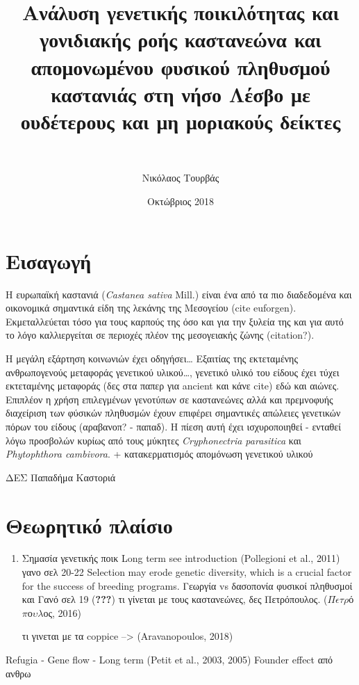 \documentclass[12pt,a4paper,]{report}
\title{Ανάλυση γενετικής ποικιλότητας και γονιδιακής ροής καστανεώνα και
απομονωμένου φυσικού πληθυσμού καστανιάς στη νήσο Λέσβο με ουδέτερους
και μη μοριακούς δείκτες}
\subtitle{~}
\author{Νικόλαος Τουρβάς}
\date{Οκτώβριος 2018}
\begin{document}
\maketitle

\section{Εισαγωγή}

Η ευρωπαϊκή καστανιά (\emph{Castanea sativa} Mill.) είναι ένα από τα πιο
διαδεδομένα και οικονομικά σημαντικά είδη της λεκάνης της Μεσογείου
(cite euforgen). Εκμεταλλεύεται τόσο για τους καρπούς της όσο και για
την ξυλεία της και για αυτό το λόγο καλλιεργείται σε περιοχές πλέον της
μεσογειακής ζώνης (citation?).

Η μεγάλη εξάρτηση κοινωνιών έχει οδηγήσει\ldots{} Εξαιτίας της
εκτεταμένης ανθρωπογενούς μεταφοράς γενετικού υλικού\ldots{}, γενετικό
υλικό του είδους έχει τύχει εκτεταμένης μεταφοράς (δες στα παπερ για
ancient και κάνε cite) εδώ και αιώνες. Επιπλέον η χρήση επιλεγμένων
γενοτύπων σε καστανεώνες αλλά και πρεμνοφυής διαχείριση των φύσικών
πληθυσμών έχουν επιφέρει σημαντικές απώλειες γενετικών πόρων του είδους
(αραβανοπ? - παπαδ). Η πίεση αυτή έχει ισχυροποιηθεί - ενταθεί λόγω
προσβολών κυρίως από τους μύκητες \emph{Cryphonectria parasitica} και
\emph{Phytophthora cambivora}. + κατακερματισμός απομόνωση γενετικού
υλικού

ΔΕΣ Παπαδήμα Καστοριά

\hypertarget{-}{%
\section{Θεωρητικό πλαίσιο}\label{-}}

\begin{enumerate}
\def\labelenumi{\arabic{enumi}.}
\item
  Σημασία γενετικής ποικ Long term see introduction (Pollegioni et al.,
  2011) γανο σελ 20-22 Selection may erode genetic diversity, which is a
  crucial factor for the success of breeding programs. Γεωργία vs
  δασοπονία φυσικοί πληθυσμοί και Γανό σελ 19 ({\textbf{???}}) τι
  γίνεται με τους καστανεώνες, δες Πετρόπουλος.
  (\(\Pi\)\(\epsilon\)\(\tau\)\(\rho\)ό\(\pi\)ο\(\upsilon\)\(\lambda\)ος,
  2016)

  τι γινεται με τα coppice --\textgreater{} (Aravanopoulos, 2018)
\end{enumerate}

Refugia - Gene flow - Long term (Petit et al., 2003, 2005) Founder
effect από ανθρω
\end{document}
